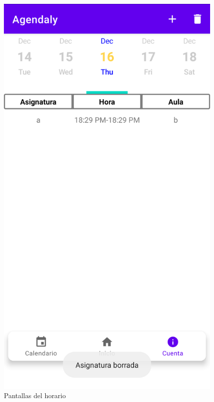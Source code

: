 \documentclass[a4paper,openright,12pt]{article}
\begin{document}
\begin{figure}
              \includegraphics[scale=0.05]{asignaturaBorrToast.png}
            \caption{Pantallas del horario}
        \end{figure}
        
\end{document}
